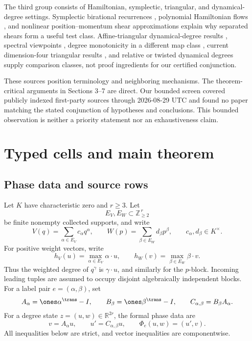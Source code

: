 \documentclass[11pt]{article}
\theoremstyle{definition}
\theoremstyle{remark}
\begin{document}
The third group consists of Hamiltonian, symplectic, triangular, and
dynamical-degree settings.  Symplectic birational recurrences
\cite{fordy_hone_2011}, polynomial Hamiltonian flows
\cite{koch_lomeli_2014}, and nonlinear position--momentum shear
approximations \cite{berger_turaev_2025} explain why separated shears form
a useful test class.  Affine-triangular dynamical-degree results
\cite{blanc_van_santen_2022}, spectral viewpoints
\cite{dang_favre_2021}, degree monotonicity in a different map class
\cite{bianchi_dinh_rakhimov_2024}, current dimension-four triangular
results \cite{shao_sun_2025}, and relative or twisted dynamical degrees
\cite{abboud_xie_2026} supply comparison classes, not proof ingredients for
our certified conjunction.

These sources position terminology and neighboring mechanisms.  The
theorem-critical arguments in Sections 3--7 are direct.  Our bounded screen
covered publicly indexed first-party sources through 2026-08-29 UTC and
found no paper matching the stated conjunction of hypotheses and
conclusions.  This bounded observation is neither a priority statement nor
an exhaustiveness claim.

\section{Typed cells and main theorem}

\subsection{Phase data and source rows}

Let \(K\) have characteristic zero and \(r\geq3\).  Let
\[
 E_V,E_W\subset\mathbb Z_{\geq2}^{\,r}
\]
be finite nonempty collected supports, and write
\[
 V(q)=\sum_{\alpha\in E_V}c_\alpha q^\alpha,\qquad
 W(p)=\sum_{\beta\in E_W}d_\beta p^\beta,
 \qquad c_\alpha,d_\beta\in K^\times .
\]
For positive weight vectors, write
\[
 h_V(u)=\max_{\alpha\in E_V}\alpha\cdot u,\qquad
 h_W(v)=\max_{\beta\in E_W}\beta\cdot v.
\tag{3.1}
\]
Thus the weighted degree of \(q^\gamma\) is \(\gamma\cdot u\), and
similarly for the \(p\)-block.
Incoming leading tuples are assumed to occupy disjoint algebraically
independent blocks.  For a label pair \(e=(\alpha,\beta)\), set
\[
 A_\alpha=\ones\alpha^{\trans}-I,\qquad
 B_\beta=\ones\beta^{\trans}-I,\qquad
 C_{\alpha,\beta}=B_\beta A_\alpha .
\]
For a degree state \(z=(u,w)\in\mathbb R^{2r}\), the formal phase data are
\[
 v=A_\alpha u,\qquad u'=C_{\alpha,\beta}u,\qquad
 \Phi_e(u,w)=(u',v).
\tag{3.2}
\]
All inequalities below are strict, and vector inequalities are
componentwise.
\end{document}
